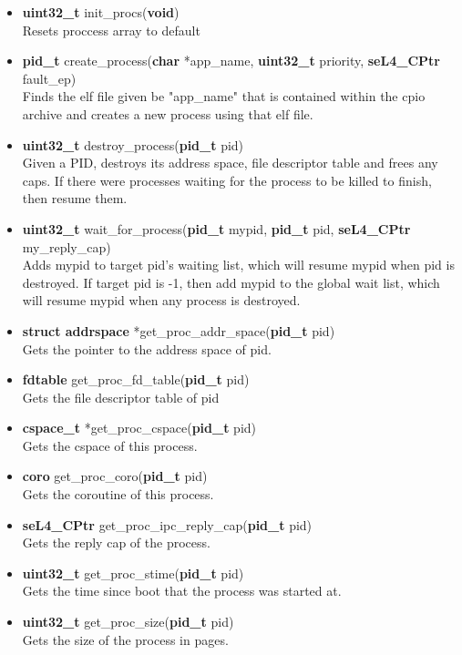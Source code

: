 \documentclass[12pt]{article}
\begin{document}
\begin{itemize}
\item \textbf{uint32\_t} init\_procs(\textbf{void})\\
Resets proccess array to default
\item \textbf{pid\_t} create\_process(\textbf{char} *app\_name, \textbf{uint32\_t} priority, \textbf{seL4\_CPtr} fault\_ep)\\
Finds the elf file given be "app\_name" that is contained within the cpio archive and creates a new process using that elf file.
\item \textbf{uint32\_t} destroy\_process(\textbf{pid\_t} pid)\\
Given a PID, destroys its address space, file descriptor table and frees any caps. If there were processes waiting for the process to be killed to finish, then resume them.
\item \textbf{uint32\_t} wait\_for\_process(\textbf{pid\_t} mypid, \textbf{pid\_t} pid, \textbf{seL4\_CPtr} my\_reply\_cap)\\
Adds mypid to target pid's waiting list, which will resume mypid when pid is destroyed. If target pid is -1, then add mypid to the global wait list, which will resume mypid when any process is destroyed.
\item \textbf{struct addrspace} *get\_proc\_addr\_space(\textbf{pid\_t} pid)\\
Gets the pointer to the address space of pid.
\item \textbf{fdtable} get\_proc\_fd\_table(\textbf{pid\_t} pid)\\
Gets the file descriptor table of pid
\item \textbf{cspace\_t} *get\_proc\_cspace(\textbf{pid\_t} pid)\\
Gets the cspace of this process.
\item \textbf{coro} get\_proc\_coro(\textbf{pid\_t} pid)\\
Gets the coroutine of this process.
\item \textbf{seL4\_CPtr} get\_proc\_ipc\_reply\_cap(\textbf{pid\_t} pid)\\
Gets the reply cap of the process.
\item \textbf{uint32\_t} get\_proc\_stime(\textbf{pid\_t} pid)\\
Gets the time since boot that the process was started at.
\item \textbf{uint32\_t} get\_proc\_size(\textbf{pid\_t} pid)\\
Gets the size of the process in pages.

\end{itemize}
\end{document}
